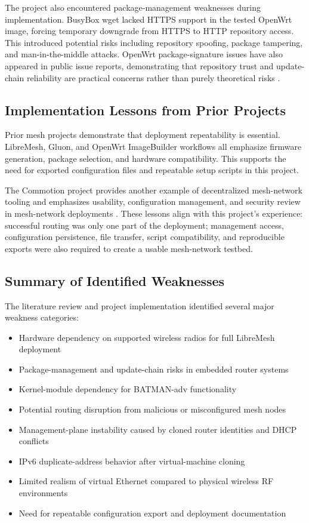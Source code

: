 \documentclass[conference]{IEEEtran}
\begin{document}
The project also encountered package-management weaknesses during implementation. BusyBox wget lacked HTTPS support in the tested OpenWrt image, forcing temporary downgrade from HTTPS to HTTP repository access. This introduced potential risks including repository spoofing, package tampering, and man-in-the-middle attacks. OpenWrt package-signature issues have also appeared in public issue reports, demonstrating that repository trust and update-chain reliability are practical concerns rather than purely theoretical risks \cite{openwrtsigissue}.

\subsection{Implementation Lessons from Prior Projects}

Prior mesh projects demonstrate that deployment repeatability is essential. LibreMesh, Gluon, and OpenWrt ImageBuilder workflows all emphasize firmware generation, package selection, and hardware compatibility. This supports the need for exported configuration files and repeatable setup scripts in this project.

The Commotion project provides another example of decentralized mesh-network tooling and emphasizes usability, configuration management, and security review in mesh-network deployments \cite{commotionaudit}. These lessons align with this project's experience: successful routing was only one part of the deployment; management access, configuration persistence, file transfer, script compatibility, and reproducible exports were also required to create a usable mesh-network testbed.

\subsection{Summary of Identified Weaknesses}

The literature review and project implementation identified several major weakness categories:

\begin{itemize}
    \item Hardware dependency on supported wireless radios for full LibreMesh deployment
    \item Package-management and update-chain risks in embedded router systems
    \item Kernel-module dependency for BATMAN-adv functionality
    \item Potential routing disruption from malicious or misconfigured mesh nodes
    \item Management-plane instability caused by cloned router identities and DHCP conflicts
    \item IPv6 duplicate-address behavior after virtual-machine cloning
    \item Limited realism of virtual Ethernet compared to physical wireless RF environments
    \item Need for repeatable configuration export and deployment documentation
\end{itemize}
\end{document}
